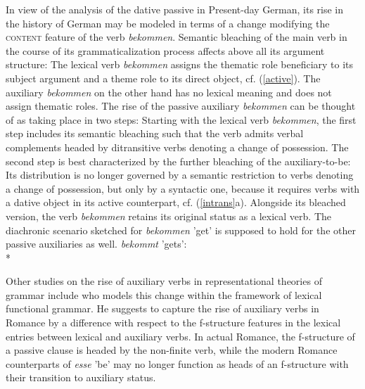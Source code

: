 \documentclass[output=paper]{langsci/langscibook}
\begin{document}
In view of the analysis of the dative passive in Present-day German, its rise in the history of German may be modeled in terms of a change modifying the \textsc{content} feature of the verb \textit{bekommen}. Semantic bleaching of the main verb in the course of its grammaticalization process affects above all its argument structure: The lexical verb \textit{bekommen} assigns the thematic role beneficiary to its subject argument and a theme role to its direct object, cf. (\ref{active}). The auxiliary \textit{bekommen} on the other hand has no lexical meaning and does not assign thematic roles. The rise of the passive auxiliary \textit{bekommen} can be thought of as taking place in two steps:
Starting with the lexical verb \textit{bekommen}, the first step includes its semantic bleaching such that the verb admits verbal complements headed by ditransitive verbs denoting a change of possession. The second step is best characterized by the further bleaching of the auxiliary-to-be: Its distribution is no longer governed by a semantic restriction to verbs denoting a change of possession, but only by a syntactic one, because it requires verbs with a dative object in its active counterpart, cf. (\ref{intrans}a). Alongside its bleached version, the verb \textit{bekommen} retains its original status as a lexical verb. The diachronic scenario sketched for \textit{bekommen} 'get' is supposed to hold for the other passive auxiliaries as well. 
\ea \label{active} 
\textit{bekommt} 'gets': \\* 
\z 

Other studies on the rise of auxiliary verbs in representational theories of grammar include \cite{schwarze2001} who models this change within the framework of lexical functional grammar. He suggests to capture the rise of auxiliary verbs in Romance by a difference with respect to the f-structure features in the lexical entries between lexical and auxiliary verbs. In actual Romance, the f-structure of a passive clause is headed by the non-finite verb, while the modern Romance counterparts of  \textit{esse} 'be' may no longer function as heads of an f-structure with their transition to auxiliary status.
\end{document}
